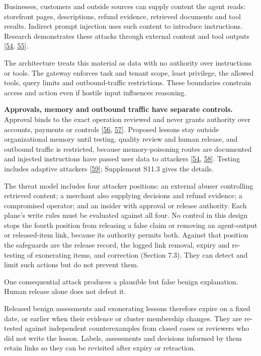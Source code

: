 \documentclass[
  11pt,
]{article}
\begin{document}
Businesses, customers and outside sources can supply content the agent
reads: storefront pages, descriptions, refund evidence, retrieved
documents and tool results. Indirect prompt injection uses such content
to introduce instructions. Research demonstrates these attacks through
external content and tool outputs
{[}\protect\hyperlink{ref-Greshake2023}{54},
\protect\hyperlink{ref-Debenedetti2024}{55}{]}.

The architecture treats this material as data with no authority over
instructions or tools. The gateway enforces task and tenant scope, least
privilege, the allowed tools, query limits and outbound-traffic
restrictions. These boundaries constrain access and action even if
hostile input influences reasoning.

\textbf{Approvals, memory and outbound traffic have separate controls.}
Approval binds to the exact operation reviewed and never grants
authority over accounts, payments or controls
{[}\protect\hyperlink{ref-Kumar2026}{56},
\protect\hyperlink{ref-InvariantLabs2025}{57}{]}. Proposed lessons stay
outside organizational memory until testing, quality review and human
release, and outbound traffic is restricted, because memory-poisoning
routes are documented and injected instructions have passed user data to
attackers {[}\protect\hyperlink{ref-Greshake2023}{54},
\protect\hyperlink{ref-Dash2026}{58}{]}. Testing includes adaptive
attackers {[}\protect\hyperlink{ref-Nasr2025}{59}{]}; Supplement S11.3
gives the details.

The threat model includes four attacker positions: an external abuser
controlling retrieved content; a merchant also supplying decisions and
refund evidence; a compromised operator; and an insider with approval or
release authority. Each plane's write rules must be evaluated against
all four. No control in this design stops the fourth position from
releasing a false claim or removing an agent-output or released-item
link, because its authority permits both. Against that position the
safeguards are the release record, the logged link removal, expiry and
re-testing of exonerating items, and correction (Section 7.3). They can
detect and limit such actions but do not prevent them.

One consequential attack produces a plausible but false benign
explanation. Human release alone does not defeat it.

Released benign assessments and exonerating lessons therefore expire on
a fixed date, or earlier when their evidence or cluster membership
changes. They are re-tested against independent counterexamples from
closed cases or reviewers who did not write the lesson. Labels,
assessments and decisions informed by them retain links so they can be
revisited after expiry or retraction.
\end{document}
